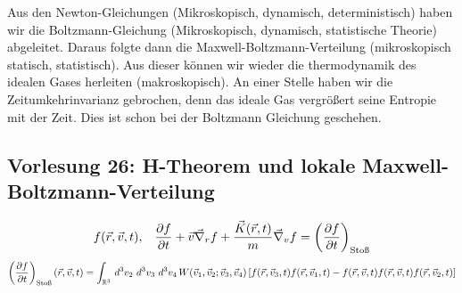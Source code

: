 Aus den Newton-Gleichungen (Mikroskopisch, dynamisch, deterministisch)
haben wir die Boltzmann-Gleichung (Mikroskopisch, dynamisch, statistische Theorie)
abgeleitet. Daraus folgte dann die Maxwell-Boltzmann-Verteilung
(mikroskopisch statisch, statistisch). Aus dieser können wir wieder die thermodynamik
des idealen Gases herleiten (makroskopisch). An einer Stelle haben wir die Zeitumkehrinvarianz
gebrochen, denn das ideale Gas vergrößert seine Entropie mit der Zeit.
Dies ist schon bei der Boltzmann Gleichung geschehen.

\subsection*{Vorlesung 26: H-Theorem und lokale Maxwell-Boltzmann-Verteilung}
%
\begin{align*}
  f(\vec{r},\vec{v},t) , && \frac{\partial f }{\partial t} + \vec{v} \vec{\nabla}_r f + 
  \frac{\vec{K}(\vec{r}, t)}{m} \vec{\nabla}_v f = \left( \frac{\partial f }{\partial t} \right)_\text{Stoß}
\end{align*}
%
%
\begin{align*}
  \left( \frac{\partial f }{\partial t} \right)_\text{Stoß} (\vec{r}, \vec{v}, t) = 
  \int_{\mathbb{R}^3}^{} \,d^3 v_2\, \,d^3 v_3\, \,d^3 v_4\, W(\vec{v}_1,\vec{v}_2; \vec{v}_3, \vec{v}_4)
  \left[ f(\vec{r}, \vec{v}_3, t) f(\vec{r}, \vec{v}_1, t) - f(\vec{r}, \vec{v}, t) f(\vec{r}, \vec{v}, t) f(\vec{r}, \vec{v}_2, t) \right]
\end{align*}
%

